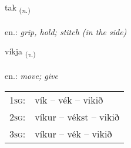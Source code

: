 \documentclass[frontgrid, backgrid]{flacards}\usepackage[]{graphicx}\usepackage[]{xcolor}
\begin{document}
\renewcommand{\flhead}{\vskip5pt \fboxsep=0pt {\small\bfseries\footnotesize Nafnorð | Noun}}
\renewcommand{\fcfoot}{\vskip5pt \fboxsep=0pt \hspace{2pt}{\small\bfseries\footnotesize 2K}}

\renewcommand{\blhead}{\vskip5pt {\small\bfseries\footnotesize Nafnorð | Noun }}
\renewcommand{\bcfoot}{\vskip5pt \hspace{2pt}{\small\bfseries\footnotesize 2K}}


{tak \small{\textsubscript{(\textit{n.})}} \\[1ex] %
\textphonetic{[tʰaːk]} \\
en.: \emph{grip, hold; stitch (in the side)} \\  [2ex]
\renewcommand*{\arraystretch}{0.8}
}

\renewcommand{\flhead}{\vskip5pt \fboxsep=0pt {\small\bfseries\footnotesize Sagnorð | Verb}}
\renewcommand{\fcfoot}{\vskip5pt \fboxsep=0pt \hspace{2pt}{\small\bfseries\footnotesize 2K}}

\renewcommand{\blhead}{\vskip5pt {\small\bfseries\footnotesize Sagnorð | Verb }}
\renewcommand{\bcfoot}{\vskip5pt \hspace{2pt}{\small\bfseries\footnotesize 2K}}


{víkja \small{\textsubscript{(\textit{v.})}} \\[1ex] %
\textphonetic{[viːca]} \\
en.: \emph{move; give} \\  [2ex]
\renewcommand*{\arraystretch}{0.8}
\begin{tabular}{p{1cm}l}
\textsc{1sg}: & vík -- vék -- vikið \\ 
\textsc{2sg}: & víkur -- vékst -- vikið \\ 
\textsc{3sg}: & víkur -- vék -- vikið \\ 
\end{tabular}
}
\end{document}
